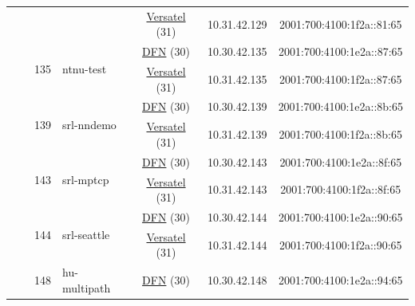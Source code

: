 \begin{small}
\begin{center}
\begin{longtable}{|c|c|c|c|c|c|c|c|}
  &  &  &  & \multicolumn{2}{|c|}{\tiny{\href{http://www.versatel.de}{Versatel} (31)}} & \tiny{10.31.42.129} & \tiny{2001:700:4100:1f2a::81:65} \\* \cline{3-3}\cline{4-4}\cline{5-5}\cline{6-6}\cline{7-7}\cline{8-8}
  &  & \multirow{2}{*}{\tiny{135}} & \multicolumn{1}{|l|}{\multirow{2}{*}{\tiny{ntnu-test}}} & \multicolumn{2}{|c|}{\tiny{\href{https://www.dfn.de}{DFN} (30)}} & \tiny{10.30.42.135} & \tiny{2001:700:4100:1e2a::87:65} \\* \cline{5-5}\cline{6-6}\cline{7-7}\cline{8-8}
  &  &  &  & \multicolumn{2}{|c|}{\tiny{\href{http://www.versatel.de}{Versatel} (31)}} & \tiny{10.31.42.135} & \tiny{2001:700:4100:1f2a::87:65} \\* \cline{3-3}\cline{4-4}\cline{5-5}\cline{6-6}\cline{7-7}\cline{8-8}
  &  & \multirow{2}{*}{\tiny{139}} & \multicolumn{1}{|l|}{\multirow{2}{*}{\tiny{srl-nndemo}}} & \multicolumn{2}{|c|}{\tiny{\href{https://www.dfn.de}{DFN} (30)}} & \tiny{10.30.42.139} & \tiny{2001:700:4100:1e2a::8b:65} \\* \cline{5-5}\cline{6-6}\cline{7-7}\cline{8-8}
  &  &  &  & \multicolumn{2}{|c|}{\tiny{\href{http://www.versatel.de}{Versatel} (31)}} & \tiny{10.31.42.139} & \tiny{2001:700:4100:1f2a::8b:65} \\* \cline{3-3}\cline{4-4}\cline{5-5}\cline{6-6}\cline{7-7}\cline{8-8}
  &  & \multirow{2}{*}{\tiny{143}} & \multicolumn{1}{|l|}{\multirow{2}{*}{\tiny{srl-mptcp}}} & \multicolumn{2}{|c|}{\tiny{\href{https://www.dfn.de}{DFN} (30)}} & \tiny{10.30.42.143} & \tiny{2001:700:4100:1e2a::8f:65} \\* \cline{5-5}\cline{6-6}\cline{7-7}\cline{8-8}
  &  &  &  & \multicolumn{2}{|c|}{\tiny{\href{http://www.versatel.de}{Versatel} (31)}} & \tiny{10.31.42.143} & \tiny{2001:700:4100:1f2a::8f:65} \\* \cline{3-3}\cline{4-4}\cline{5-5}\cline{6-6}\cline{7-7}\cline{8-8}
  &  & \multirow{2}{*}{\tiny{144}} & \multicolumn{1}{|l|}{\multirow{2}{*}{\tiny{srl-seattle}}} & \multicolumn{2}{|c|}{\tiny{\href{https://www.dfn.de}{DFN} (30)}} & \tiny{10.30.42.144} & \tiny{2001:700:4100:1e2a::90:65} \\* \cline{5-5}\cline{6-6}\cline{7-7}\cline{8-8}
  &  &  &  & \multicolumn{2}{|c|}{\tiny{\href{http://www.versatel.de}{Versatel} (31)}} & \tiny{10.31.42.144} & \tiny{2001:700:4100:1f2a::90:65} \\* \cline{3-3}\cline{4-4}\cline{5-5}\cline{6-6}\cline{7-7}\cline{8-8}
  &  & \multirow{2}{*}{\tiny{148}} & \multicolumn{1}{|l|}{\multirow{2}{*}{\tiny{hu-multipath}}} & \multicolumn{2}{|c|}{\tiny{\href{https://www.dfn.de}{DFN} (30)}} & \tiny{10.30.42.148} & \tiny{2001:700:4100:1e2a::94:65} \\* \cline{5-5}\cline{6-6}\cline{7-7}\cline{8-8}

\end{longtable}
\end{center}
\end{small}
